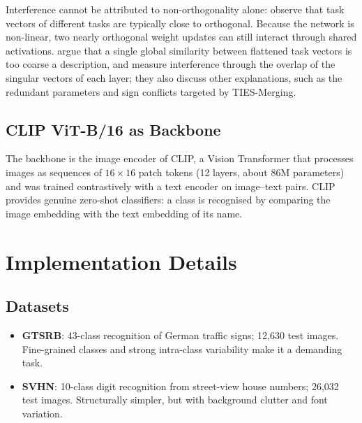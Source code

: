 \documentclass[11pt,a4paper,twocolumn]{article}
\begin{document}
Interference cannot be attributed to non-orthogonality alone:
\citet{ilharco2023} observe that task vectors of different tasks are
typically close to orthogonal. Because the network is non-linear, two
nearly orthogonal weight updates can still interact through shared
activations. \citet{gargiulo2025} argue that a single global similarity
between flattened task vectors is too coarse a description, and measure
interference through the overlap of the singular vectors of each layer;
they also discuss other explanations, such as the redundant parameters and
sign conflicts targeted by TIES-Merging.

\subsection{CLIP ViT-B/16 as Backbone}
The backbone is the image encoder of CLIP, a
Vision Transformer that processes images as
sequences of $16\times16$ patch tokens (12 layers, about 86M parameters)
and was trained contrastively with a text encoder on image--text pairs.
CLIP provides genuine zero-shot classifiers: a class is recognised by
comparing the image embedding with the text embedding of its name.

\section{Implementation Details}

\subsection{Datasets}
\begin{itemize}
  \item \textbf{GTSRB}: 43-class recognition of
  German traffic signs; 12{,}630 test images. Fine-grained classes and
  strong intra-class variability make it a demanding task.
  \item \textbf{SVHN}: 10-class digit recognition
  from street-view house numbers; 26{,}032 test images. Structurally
  simpler, but with background clutter and font variation.
\end{itemize}
\end{document}
